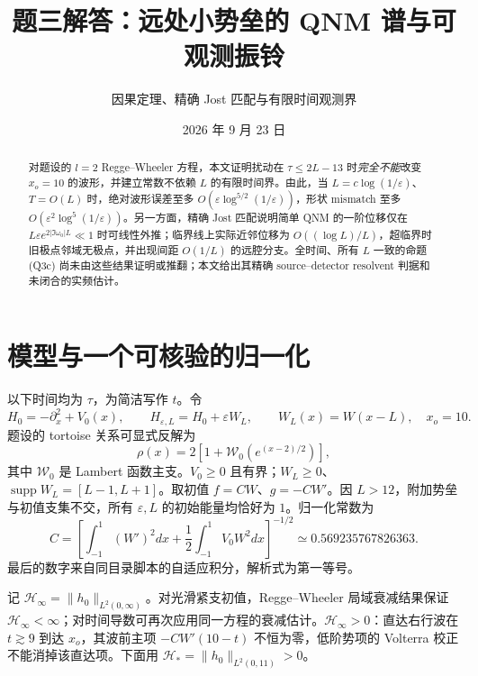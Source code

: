 \documentclass[UTF8,a4paper,11pt]{ctexart}
\title{题三解答：远处小势垒的 QNM 谱与可观测振铃}
\author{因果定理、精确 Jost 匹配与有限时间观测界}
\date{2026 年 9 月 23 日}
\DeclareMathOperator{\supp}{supp}
\newcommand{\ee}{\varepsilon}
\newcommand{\HH}{\mathcal H}
\newcommand{\WW}{\mathcal W}
\begin{document}
\maketitle
\begin{abstract}
对题设的 $l=2$ Regge--Wheeler 方程，本文证明扰动在 $\tau\leq2L-13$ 时\emph{完全不能}改变 $x_o=10$ 的波形，并建立常数不依赖 $L$ 的有限时间界。由此，当 $L=c\log(1/\ee)$、$T=O(L)$ 时，绝对波形误差至多 $O(\ee\log^{5/2}(1/\ee))$，形状 mismatch 至多 $O(\ee^2\log^5(1/\ee))$。另一方面，精确 Jost 匹配说明简单 QNM 的一阶位移仅在 $L\ee e^{2|\Im\omega_0|L}\ll1$ 时可线性外推；临界线上实际近邻位移为 $O((\log L)/L)$，超临界时旧极点邻域无极点，并出现间距 $O(1/L)$ 的远腔分支。全时间、所有 $L$ 一致的命题 (Q3c) 尚未由这些结果证明或推翻；本文给出其精确 source--detector resolvent 判据和未闭合的实频估计。
\end{abstract}

\section{模型与一个可核验的归一化}
以下时间均为 $\tau$，为简洁写作 $t$。令
\begin{equation}
 H_0=-\partial_x^2+V_0(x),\qquad H_{\ee,L}=H_0+\ee W_L,
 \qquad W_L(x)=W(x-L),\quad x_o=10.
\end{equation}
题设的 tortoise 关系可显式反解为
\begin{equation}\label{eq:rho}
 \rho(x)=2\left[1+\WW_0\!\left(e^{(x-2)/2}\right)\right],
\end{equation}
其中 $\WW_0$ 是 Lambert 函数主支。$V_0\geq0$ 且有界；$W_L\geq0$、$\supp W_L=[L-1,L+1]$。取初值
$f=CW$、$g=-CW'$。因 $L>12$，附加势垒与初值支集不交，所有 $\ee,L$ 的初始能量均恰好为 $1$。归一化常数为
\begin{equation}\label{eq:C}
 C=\left[\int_{-1}^{1}(W')^2dx+
 \frac12\int_{-1}^{1}V_0W^2dx\right]^{-1/2}
 \simeq0.569235767826363.
\end{equation}
最后的数字来自同目录脚本的自适应积分，解析式为第一等号。

记 $\HH_\infty=\|h_0\|_{L^2(0,\infty)}$。对光滑紧支初值，Regge--Wheeler 局域衰减结果保证 $\HH_\infty<\infty$\cite{ABW,DSS}；对时间导数可再次应用同一方程的衰减估计。$\HH_\infty>0$：直达右行波在 $t\gtrsim9$ 到达 $x_o$，其波前主项 $-CW'(10-t)$ 不恒为零，低阶势项的 Volterra 校正不能消掉该直达项。下面用 $\HH_*=\|h_0\|_{L^2(0,11)}>0$。
\end{document}
